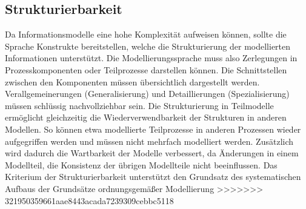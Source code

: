 \subsection{Strukturierbarkeit}
\label{ssc:Strukturierbarkeit}
Da Informationsmodelle eine hohe Komplexität aufweisen können, sollte die Sprache Konstrukte bereitstellen, welche die Strukturierung der modellierten Informationen unterstützt. Die Modellierungssprache muss also Zerlegungen in Prozesskomponenten oder Teilprozesse darstellen können. Die Schnittstellen zwischen den Komponenten müssen übersichtlich dargestellt werden. Verallgemeinerungen (Generalisierung) und Detaillierungen (Spezialisierung) müssen schlüssig nachvollziehbar sein. Die Strukturierung in Teilmodelle ermöglicht gleichzeitig die Wiederverwendbarkeit der Strukturen in anderen Modellen. So können etwa modellierte Teilprozesse in anderen Prozessen wieder aufgegriffen werden und müssen nicht mehrfach modelliert werden. Zusätzlich wird dadurch die Wartbarkeit der Modelle verbessert, da Änderungen in einem Modellteil, die Konsistenz der übrigen Modellteile nicht beeinflussen. Das Kriterium der Strukturierbarkeit unterstützt den Grundsatz des systematischen Aufbaus der Grundsätze ordnungsgemäßer Modellierung
>>>>>>> 321950359661aae8443acada7239309cebbc5118
